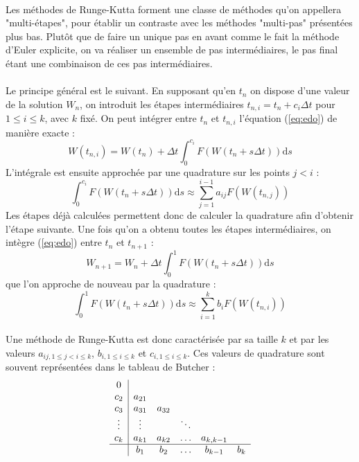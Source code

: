     \paragraph{}
    Les méthodes de Runge-Kutta forment une classe de méthodes qu'on appellera "multi-étapes", pour établir un contraste avec les méthodes "multi-pas" présentées plus bas.
    Plutôt que de faire un unique pas en avant comme le fait la méthode d'Euler explicite, on va réaliser un ensemble de pas intermédiaires, le pas final étant une combinaison de ces pas intermédiaires.

    \paragraph{}
    Le principe général est le suivant.
    En supposant qu'en $t_n$ on dispose d'une valeur de la solution $W_n$, on introduit les étapes intermédiaires $t_{n,i} = t_n + c_i\Delta t$ pour $1\leq i\leq k$, avec $k$ fixé.
    On peut intégrer entre $t_n$ et $t_{n,i}$ l'équation (\ref{eq:edo}) de manière exacte :
    \[W\left(t_{n,i}\right) = W\left(t_n\right) + \Delta t \int_0^{c_i}F\left(W\left(t_n + s\Delta t\right)\right)\mathrm{d}s\]
    L'intégrale est ensuite approchée par une quadrature sur les points $j<i$ :
    \[\int_0^{c_i}F\left(W\left(t_n + s\Delta t\right)\right)\mathrm{d}s \approx \sum_{j = 1}^{i-1}a_{ij}F\left(W\left(t_{n,j}\right)\right)\]
    Les étapes déjà calculées permettent donc de calculer la quadrature afin d'obtenir l'étape suivante.
    Une fois qu'on a obtenu toutes les étapes intermédiaires, on intègre (\ref{eq:edo}) entre $t_n$ et $t_{n+1}$ :
    \[W_{n+1} = W_n + \Delta t \int_0^1F\left(W\left(t_n + s\Delta t\right)\right)\mathrm{d}s\]
    que l'on approche de nouveau par la quadrature :
    \[\int_0^1F\left(W\left(t_n + s\Delta t\right)\right)\mathrm{d}s \approx \sum_{i = 1}^kb_iF\left(W\left(t_{n,i}\right)\right)\]

    \paragraph{}
    Une méthode de Runge-Kutta est donc caractérisée par sa taille $k$ et par les valeurs $a_{ij, 1\leq j<i\leq k}$, $b_{i, 1\leq i\leq k}$ et $c_{i, 1\leq i\leq k}$.
    Ces valeurs de quadrature sont souvent représentées dans le tableau de Butcher :
    \[\begin{array}{c|ccccc}
      0\\
      c_2    & a_{21} \\
      c_3    & a_{31} & a_{32} \\
      \vdots & \vdots &        & \ddots\\
      c_k    & a_{k1} & a_{k2} & \hdots & a_{k,k-1}\\
      \hline & b_1    & b_2    & \hdots & b_{k-1} & b_k
    \end{array}\]

